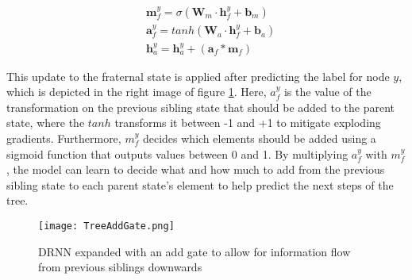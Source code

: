 \begin{align}
    &\mathbf{m}_f^y = \sigma(\mathbf{W}_m \cdot \mathbf{h}_f^y + \mathbf{b}_m)\\
    &\mathbf{a}_f^y = tanh(\mathbf{W}_a \cdot \mathbf{h}_f^y + \mathbf{b}_a)\\
    &\mathbf{h}_a^y = \mathbf{h}_a^y + (\mathbf{a}_f * \mathbf{m}_f)
\end{align}

This update to the fraternal state is applied after predicting the label for node $y$, which is depicted in the right image of figure \ref{fig:treeAddGate}. Here, $a_f^y$ is the value of the transformation on the previous sibling state that should be added to the parent state, where the $tanh$ transforms it between -1 and +1 to mitigate exploding gradients. Furthermore, $m_f^y$ decides which elements should be added using a sigmoid function that outputs values between 0 and 1. By multiplying $a_f^y$ with $m_f^y$, the model can learn to decide what and how much to add from the previous sibling state to each parent state's element to help predict the next steps of the tree.


\begin{figure}[ht!]
    \centering
    \texttt{[image: TreeAddGate.png]}
    \caption{DRNN expanded with an add gate to allow for information flow from previous siblings downwards}
    \label{fig:treeAddGate}
\end{figure}


